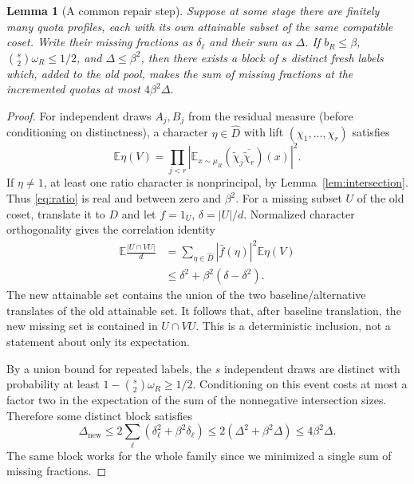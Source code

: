\documentclass[11pt]{article}
\newtheorem{lemma}[theorem]{Lemma}
\theoremstyle{definition}\newtheorem{remark}[theorem]{Remark}
\newcommand{\E}{\mathbb E}
\newcommand{\abs}[1]{\left|#1\right|}
\begin{document}
\begin{lemma}[A common repair step]\label{lem:repair}
Suppose at some stage there are finitely many quota profiles, each with its own attainable subset of the same compatible coset. Write their missing fractions as $\delta_\ell$ and their sum as $\Delta$. If $b_R\le\beta$, $\binom{s}{2}\omega_R\le1/2$, and $\Delta\le\beta^2$, then there exists a block of $s$ distinct fresh labels which, added to the old pool, makes the sum of missing fractions at the incremented quotas at most $4\beta^2\Delta$.
\end{lemma}
\begin{proof}
For independent draws $A_j,B_j$ from the residual measure (before conditioning on distinctness), a character $\eta\in\widehat D$ with lift $(\chi_1,\dots,\chi_r)$ satisfies
\begin{equation}\label{eq:ratio}
 \E\eta(V)=\prod_{j<r}\abs{\E_{x\sim\mu_R}(\widetilde\chi_j\overline{\widetilde\chi_r})(x)}^2 .
\end{equation}
If $\eta\ne1$, at least one ratio character is nonprincipal, by Lemma~\ref{lem:intersection}. Thus \eqref{eq:ratio} is real and between zero and $\beta^2$. For a missing subset $U$ of the old coset, translate it to $D$ and let $f=1_U$, $\delta=|U|/d$. Normalized character orthogonality gives the correlation identity
\begin{align*}
 \E\frac{|U\cap VU|}{d}
 &=\sum_{\eta\in\widehat D}|\widehat f(\eta)|^2\E\eta(V)\\
 &\le\delta^2+\beta^2(\delta-\delta^2).
\end{align*}
The new attainable set contains the union of the two baseline/alternative translates of the old attainable set. It follows that, after baseline translation, the new missing set is contained in $U\cap VU$. This is a deterministic inclusion, not a statement about only its expectation.

By a union bound for repeated labels, the $s$ independent draws are distinct with probability at least $1-\binom{s}{2}\omega_R\ge1/2$. Conditioning on this event costs at most a factor two in the expectation of the sum of the nonnegative intersection sizes. Therefore some distinct block satisfies
\[
 \Delta_{\mathrm{new}}\le 2\sum_\ell(\delta_\ell^2+\beta^2\delta_\ell)
 \le2(\Delta^2+\beta^2\Delta)\le4\beta^2\Delta.
\]
The same block works for the whole family since we minimized a single sum of missing fractions.
\end{proof}
\end{document}
